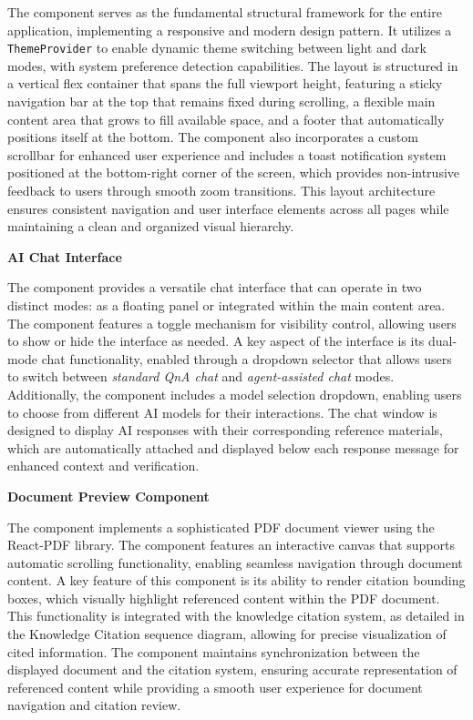 \documentclass[../Main.tex]{subfiles}
\begin{document}
{{	The  component serves as the
	fundamental structural framework for the entire application, implementing a
	responsive and modern design pattern. It utilizes a \texttt{ThemeProvider} to
	enable dynamic theme switching between light and dark modes, with system preference
	detection capabilities. The layout is structured in a vertical flex container
	that spans the full viewport height, featuring a sticky navigation bar at the top
	that remains fixed during scrolling, a flexible main content area that grows
	to fill available space, and a footer that automatically positions itself at the
	bottom. The component also incorporates a custom scrollbar for enhanced user
	experience and includes a toast notification system positioned at the bottom-right
	corner of the screen, which provides non-intrusive feedback to users through smooth
	zoom transitions. This layout architecture ensures consistent navigation and
	user interface elements across all pages while maintaining a clean and
	organized visual hierarchy.

	

	\textbf{AI Chat Interface}

	The  component provides
	a versatile chat interface that can operate in two distinct modes: as a floating
	panel or integrated within the main content area. The component features a
	toggle mechanism for visibility control, allowing users to show or hide the interface
	as needed. A key aspect of the interface is its dual-mode chat functionality, enabled
	through a dropdown selector that allows users to switch between \emph{standard
	QnA chat} and \emph{agent-assisted chat} modes. Additionally, the component includes
	a model selection dropdown, enabling users to choose from different AI models
	for their interactions. The chat window is designed to display AI responses with
	their corresponding reference materials, which are automatically attached and
	displayed below each response message for enhanced context and verification.

	

	\textbf{Document Preview Component}

	The  component
	implements a sophisticated PDF document viewer using the React-PDF library. The
	component features an interactive canvas that supports automatic scrolling functionality,
	enabling seamless navigation through document content. A key feature of this component
	is its ability to render citation bounding boxes, which visually highlight
	referenced content within the PDF document. This functionality is integrated with
	the knowledge citation system, as detailed in the Knowledge Citation sequence
	diagram, allowing for precise visualization of cited information. The
	component maintains synchronization between the displayed document and the
	citation system, ensuring accurate representation of referenced content while providing
	a smooth user experience for document navigation and citation review.

}}
\end{document}
